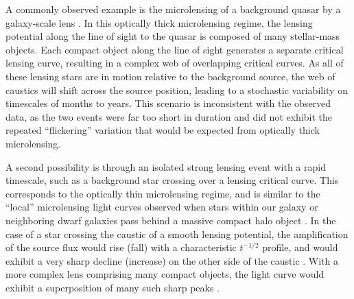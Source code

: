 A commonly observed example is the microlensing of a background quasar
by a galaxy-scale lens \citep{Wambsganss:2001, Kochanek:2004}.  In
this optically thick microlensing regime, the lensing potential along
the line of sight to the quasar is composed of many stellar-mass
objects.  Each compact object along the line of sight generates a
separate critical lensing curve, resulting in a complex web of
overlapping critical curves. As all of these lensing stars are in
motion relative to the background source, the web of caustics will
shift across the source position, leading to a stochastic variability
on timescales of months to years.  This scenario is inconsistent with
the observed data, as the two \spock events were far too short in
duration and did not exhibit the repeated ``flickering'' variation
that would be expected from optically thick microlensing.

A second possibility is through an isolated strong lensing event with
a rapid timescale, such as a background star crossing over a lensing
critical curve.  This corresponds to the optically thin microlensing
regime, and is similar to the ``local'' microlensing light curves
observed when stars within our galaxy or neighboring dwarf galaxies
pass behind a massive compact halo object \citep{Paczynski:1986,
  Alcock:1993, Aubourg:1993, Udalski:1993}.  In the case of a star
crossing the caustic of a smooth lensing potential, the amplification
of the source flux would rise (fall) with a characteristic $t^{-1/2}$
profile, and would exhibit a very sharp decline (increase) on the
other side of the caustic \citep{Schneider:1986,MiraldaEscude:1991}.
With a more complex lens comprising many compact objects, the light
curve would exhibit a superposition of many such sharp peaks
\citep{Lewis:1993}.

